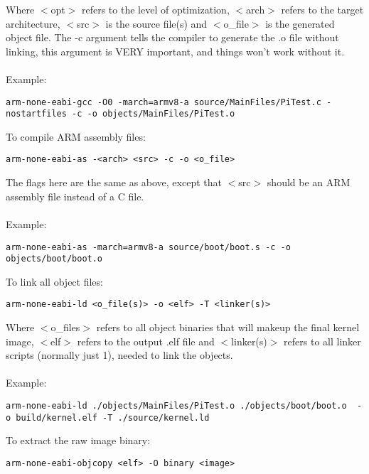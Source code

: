 \documentclass[12pt]{book}
\begin{document}
Where $<$opt$>$ refers to the level of optimization, $<$arch$>$ refers to the target architecture, $<$src$>$ is the source file(s) and $<$o\_file$>$ is the generated object file. The -c argument tells the compiler to generate the .o file without linking, this argument is VERY important, and things won't work without it.
\\~\\
Example:
\begin{lstlisting}[style = bash, xleftmargin=0\textwidth]
	arm-none-eabi-gcc -O0 -march=armv8-a source/MainFiles/PiTest.c -nostartfiles -c -o objects/MainFiles/PiTest.o
\end{lstlisting}

To compile ARM assembly files:
\begin{lstlisting}[style = bash, xleftmargin=0\textwidth]
	arm-none-eabi-as -<arch> <src> -c -o <o_file>
\end{lstlisting}

The flags here are the same as above, except that $<$src$>$ should be an ARM assembly file instead of a C file.
\\~\\
Example:
\begin{lstlisting}[style = bash, xleftmargin=0\textwidth]
	arm-none-eabi-as -march=armv8-a source/boot/boot.s -c -o objects/boot/boot.o
\end{lstlisting}

To link all object files:
\begin{lstlisting}[style = bash, xleftmargin=0\textwidth]
	arm-none-eabi-ld <o_file(s)> -o <elf> -T <linker(s)>
\end{lstlisting}

Where $<$o\_files$>$ refers to all object binaries that will makeup the final kernel image, $<$elf$>$ refers to the output .elf file and $<$linker(s)$>$ refers to all linker scripts (normally just 1), needed to link the objects.
\\~\\
Example:
\begin{lstlisting}[style = bash, xleftmargin=0\textwidth]
	arm-none-eabi-ld ./objects/MainFiles/PiTest.o ./objects/boot/boot.o  -o build/kernel.elf -T ./source/kernel.ld
\end{lstlisting}

To extract the raw image binary:
\begin{lstlisting}[style = bash, xleftmargin=0\textwidth]
	arm-none-eabi-objcopy <elf> -O binary <image>
\end{lstlisting}
\end{document}
